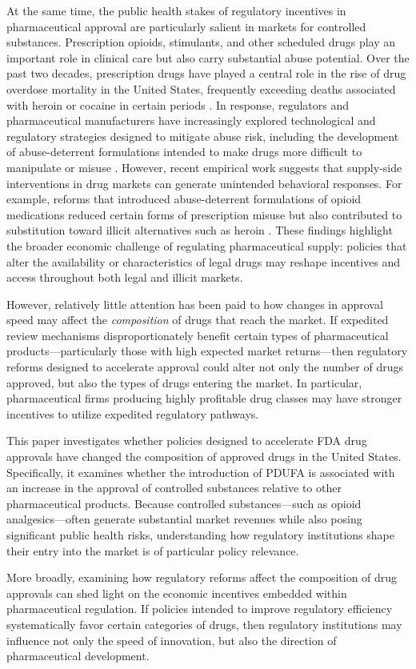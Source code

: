 At the same time, the public health stakes of regulatory incentives in pharmaceutical approval are particularly salient in markets for controlled substances. Prescription opioids, stimulants, and other scheduled drugs play an important role in clinical care but also carry substantial abuse potential. Over the past two decades, prescription drugs have played a central role in the rise of drug overdose mortality in the United States, frequently exceeding deaths associated with heroin or cocaine in certain periods \parencite{hedegaardDrugOverdoseDeaths2020a}. In response, regulators and pharmaceutical manufacturers have increasingly explored technological and regulatory strategies designed to mitigate abuse risk, including the development of abuse-deterrent formulations intended to make drugs more difficult to manipulate or misuse \parencite{colemanReducingAbusePotential2010}. However, recent empirical work suggests that supply-side interventions in drug markets can generate unintended behavioral responses. For example, reforms that introduced abuse-deterrent formulations of opioid medications reduced certain forms of prescription misuse but also contributed to substitution toward illicit alternatives such as heroin \parencite{alpertSupplySideDrugPolicy2018a}. These findings highlight the broader economic challenge of regulating pharmaceutical supply: policies that alter the availability or characteristics of legal drugs may reshape incentives and access throughout both legal and illicit markets.

However, relatively little attention has been paid to how changes in approval speed may affect the
\textit{composition} of drugs that reach the market. If expedited review mechanisms disproportionately benefit certain types of pharmaceutical products—particularly those with high expected market returns—then regulatory reforms designed to accelerate approval could alter not only the number of drugs approved, but also the types of drugs entering the market. In particular, pharmaceutical firms producing highly profitable drug classes may have stronger incentives to utilize expedited regulatory pathways.

This paper investigates whether policies designed to accelerate FDA drug approvals have changed the composition of approved drugs in the United States. Specifically, it examines whether the introduction of PDUFA is associated with an increase in the approval of controlled substances relative to other pharmaceutical products. Because controlled substances—such as opioid analgesics—often generate substantial market revenues while also posing significant public health risks, understanding how regulatory institutions shape their entry into the market is of particular policy relevance.

More broadly, examining how regulatory reforms affect the composition of drug approvals can shed light on the economic incentives embedded within pharmaceutical regulation. If policies intended to improve regulatory efficiency systematically favor certain categories of drugs, then regulatory institutions may influence not only the speed of innovation, but also the direction of pharmaceutical development.
